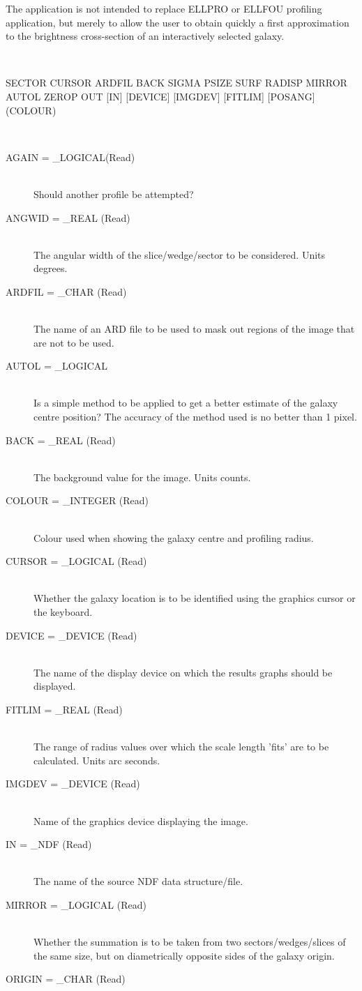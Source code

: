 \documentclass[twoside,11pt]{article}
\newcommand{\LineBreak}{\hfill\break\hbox{}\qquad}
\newcommand{\sstusage}[1]{\item[Usage:] \mbox{}
\\[1.3ex]{\raggedright \ssttt #1}}
\newcommand{\sstparameters}[1]{
   \item[Parameters:] \mbox{} \\
   \vspace{-3.5ex}
   \begin{description}
      #1
   \end{description}
}
\newcommand{\sstsubsection}[1]{ \item[{#1}] \mbox{} \\}
\newcommand{\sstusage}[1]{\item[Usage:]
      \begin{description}
         {\ssttt #1}
      \end{description}
      \\
   }
\newcommand{\sstparameters}[1]{
      \item[Parameters:] \\
      \begin{description}
         #1
      \end{description}
      \\
   }
\newcommand{\sstsubsection}[1]{\item[{#1}]}
\begin{document}
{{{      }
      The application is not intended to replace ELLPRO or ELLFOU
      profiling application, but merely to allow the user to obtain
      quickly a first approximation to the brightness cross-section of
      an interactively selected galaxy.
   }
   \sstusage{
      SECTOR CURSOR ARDFIL BACK SIGMA PSIZE SURF RADISP MIRROR AUTOL
\LineBreak
             ZEROP OUT [IN] [DEVICE] [IMGDEV] [FITLIM] [POSANG]
\LineBreak
             [ANGWID] [RLIM] [SAME] [AGAIN] [ORIGIN] (COLOUR)
   }
   \sstparameters{
      \sstsubsection{
         AGAIN = \_LOGICAL(Read)
      }{
         Should another profile be attempted?
      }
      \sstsubsection{
         ANGWID = \_REAL (Read)
      }{
         The angular width of the slice/wedge/sector to be considered.
         Units degrees.
      }
      \sstsubsection{
         ARDFIL = \_CHAR (Read)
      }{
         The name of an ARD file to be used to mask out regions of the
         image that are not to be used.
      }
      \sstsubsection{
         AUTOL = \_LOGICAL
      }{
         Is a simple method to be applied to get a better
         estimate of the galaxy centre position?
         The accuracy of the method used is no better than 1 pixel.
      }
      \sstsubsection{
         BACK = \_REAL (Read)
      }{
         The background value for the image. Units counts.
      }
      \sstsubsection{
         COLOUR = \_INTEGER (Read)
      }{
         Colour used when showing the galaxy centre and profiling radius.
      }
      \sstsubsection{
         CURSOR = \_LOGICAL (Read)
      }{
         Whether the galaxy location is to be identified using the
         graphics cursor or the keyboard.
      }
      \sstsubsection{
         DEVICE = \_DEVICE (Read)
      }{
         The name of the display device on which the results graphs
         should be displayed.
      }
      \sstsubsection{
         FITLIM = \_REAL (Read)
      }{
         The range of radius values over which the scale length 'fits'
         are to be calculated.  Units arc seconds.
      }
      \sstsubsection{
         IMGDEV = \_DEVICE (Read)
      }{
         Name of the graphics device displaying the image.
      }
      \sstsubsection{
         IN = \_NDF (Read)
      }{
         The name of the source NDF data structure/file.
      }
      \sstsubsection{
         MIRROR = \_LOGICAL (Read)
      }{
         Whether the summation is to be taken from two
         sectors/wedges/slices of the same size, but on
         diametrically opposite sides of the galaxy origin.
      }
      \sstsubsection{
         ORIGIN = \_CHAR (Read)
      }{
}}}
\end{document}
